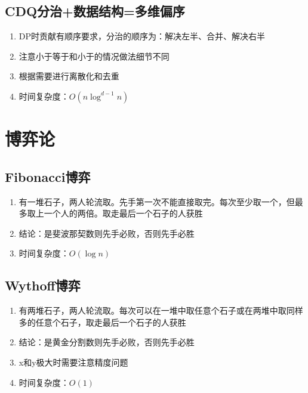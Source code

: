 \documentclass[twocolumn,a4,8pt]{article}  %
\begin{document}
		\subsection{CDQ分治+数据结构=多维偏序}
			\noindent\begin{enumerate}
				\item DP时贡献有顺序要求，分治的顺序为：解决左半、合并、解决右半
				\item 注意小于等于和小于的情况做法细节不同
				\item 根据需要进行离散化和去重
				\item 时间复杂度：$O(n\log^{d-1}n)$
			\end{enumerate}
	 	 	
	
	\section{博弈论}
		\subsection{Fibonacci博弈}
			\noindent\begin{enumerate}
				\item 有一堆石子，两人轮流取。先手第一次不能直接取完。每次至少取一个，但最多取上一个人的两倍。取走最后一个石子的人获胜
				\item 结论：是斐波那契数则先手必败，否则先手必胜
				\item 时间复杂度：$O(\log n)$
			\end{enumerate}
	 	 	
	 	 	
		\subsection{Wythoff博弈}
			\noindent\begin{enumerate}
				\item 有两堆石子，两人轮流取。每次可以在一堆中取任意个石子或在两堆中取同样多的任意个石子，取走最后一个石子的人获胜
				\item 结论：是黄金分割数则先手必败，否则先手必胜
				\item x和y极大时需要注意精度问题
				\item 时间复杂度：$O(1)$
			\end{enumerate}
	 	 	
	 	 	
\end{document}
